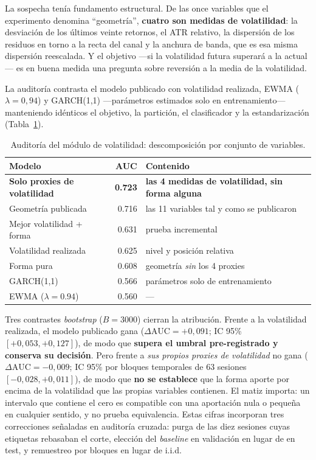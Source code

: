 \documentclass[11pt,a4paper]{article}
\begin{document}
La sospecha tenía fundamento estructural. De las once variables que el
experimento denomina ``geometría'', \textbf{cuatro son medidas de volatilidad}:
la desviación de los últimos veinte retornos, el ATR relativo, la dispersión de
los residuos en torno a la recta del canal y la anchura de banda, que es esa
misma dispersión reescalada. Y el objetivo —si la volatilidad futura superará a
la actual— es en buena medida una pregunta sobre reversión a la media de la
volatilidad.

La auditoría contrasta el modelo publicado con volatilidad realizada, EWMA
($\lambda=0{,}94$) y GARCH(1,1) —parámetros estimados solo en entrenamiento—
manteniendo idénticos el objetivo, la partición, el clasificador y la
estandarización (Tabla~\ref{tab:auditvol}).

\begin{table}[H]
\centering
\footnotesize
\caption{Auditoría del módulo de volatilidad: descomposición por conjunto de variables.}
\label{tab:auditvol}
\begin{tabular}{lrl}
\toprule
\textbf{Modelo} & \textbf{AUC} & \textbf{Contenido} \\
\midrule
\textbf{Solo proxies de volatilidad} & \textbf{0.723} & \textbf{las 4 medidas de volatilidad, sin forma alguna} \\
Geometría publicada & 0.716 & las 11 variables tal y como se publicaron \\
Mejor volatilidad + forma & 0.631 & prueba incremental \\
Volatilidad realizada & 0.625 & nivel y posición relativa \\
Forma pura & 0.608 & geometría \emph{sin} los 4 proxies \\
GARCH(1,1) & 0.566 & parámetros solo de entrenamiento \\
EWMA ($\lambda=0.94$) & 0.560 & — \\
\bottomrule
\end{tabular}
\end{table}

Tres contrastes \emph{bootstrap} ($B=3000$) cierran la atribución. Frente a la
volatilidad realizada, el modelo publicado gana ($\Delta\mathrm{AUC}=+0{,}091$;
IC 95\% $[+0{,}053,+0{,}127]$), de modo que \textbf{supera el umbral
pre-registrado y conserva su decisión}. Pero frente a \emph{sus propios proxies
de volatilidad} no gana ($\Delta\mathrm{AUC}=-0{,}009$; IC 95\% por bloques
temporales de 63 sesiones $[-0{,}028,+0{,}011]$), de modo que \textbf{no se
establece} que la forma aporte por encima de la volatilidad que las propias
variables contienen. El matiz importa: un intervalo que contiene el cero es
compatible con una aportación nula o pequeña en cualquier sentido, y no prueba
equivalencia. Estas cifras incorporan tres correcciones señaladas en auditoría
cruzada: purga de las diez sesiones cuyas etiquetas rebasaban el corte, elección
del \emph{baseline} en validación en lugar de en test, y remuestreo por bloques
en lugar de i.i.d.
\end{document}
